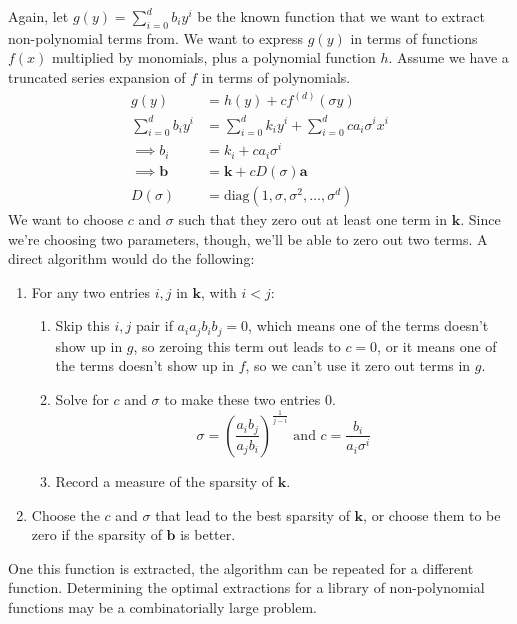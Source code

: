 \documentclass{article}
\let\vec\mathbf
\begin{document}
Again, let $g(y) = \sum_{i=0}^d b_i y^i$ be the known function that we want to
extract non-polynomial terms from. We want to express $g(y)$ in terms of
functions $f(x)$ multiplied by monomials, plus a polynomial function $h$.
Assume we have a truncated series expansion of $f$ in terms of polynomials.
\begin{align*}
g(y) &= h(y) + c f^{(d)}(\sigma y) \\
\sum_{i=0}^d b_i y^i &= \sum_{i=0}^d k_i y^i + \sum_{i=0}^d c a_i \sigma^i x^i
\\ \implies b_i &= k_i + c a_i \sigma^i 
\\ \implies \vec{b} &= \vec{k} + c D(\sigma) \vec{a} 
\\ D(\sigma) &= \text{diag}(1, \sigma, \sigma^2, \ldots, \sigma^d)
\end{align*}
We want to choose $c$ and $\sigma$ such that they zero out at least one term in $\vec{k}$.
Since we're choosing two parameters, though, we'll be able to zero out two terms.
A direct algorithm would do the following:
\begin{enumerate}
  \item For any two entries $i,j$ in $\vec{k}$, with $i < j$:
  \begin{enumerate}
    \item Skip this $i,j$ pair if $a_i a_j b_i b_j = 0$, which means  one of the
      terms doesn't show up in $g$, so zeroing this term out leads to $c = 0$,
      or it means one of the terms doesn't show up in $f$, so we can't use it
      zero out terms in $g$.
    \item Solve for $c$ and $\sigma$ to make these two entries 0.
      \begin{equation*}
        \sigma = \left(\frac{a_i b_j}{a_j b_i} \right)^{\frac{1}{j-i}} \text{ and } c = \frac{b_i}{a_i\sigma^i}
      \end{equation*}
    \item Record a measure of the sparsity of $\vec{k}$.
  \end{enumerate}
  \item Choose the $c$ and $\sigma$ that lead to the best sparsity of $\vec{k}$,
  or choose them to be zero if the sparsity of $\vec{b}$ is better.
\end{enumerate}
One this function is extracted, the algorithm can be repeated for a different
function. Determining the optimal extractions for a library of non-polynomial
functions may be a combinatorially large problem.
\end{document}
